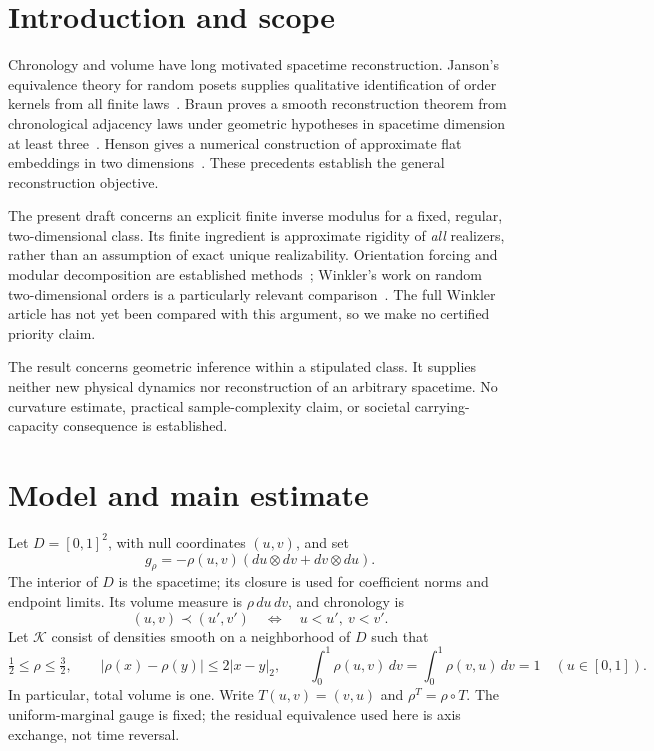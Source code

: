 \documentclass[11pt]{article}
\theoremstyle{remark}
\newcommand{\K}{\mathcal K}
\begin{document}
\section{Introduction and scope}
Chronology and volume have long motivated spacetime reconstruction.
Janson's equivalence theory for random posets supplies qualitative
identification of order kernels from all finite laws~\cite{Janson}.
Braun proves a smooth reconstruction theorem from chronological
adjacency laws under geometric hypotheses in spacetime dimension at
least three~\cite{Braun}. Henson gives a numerical construction of
approximate flat embeddings in two dimensions~\cite{Henson}.
These precedents establish the general reconstruction objective.

The present draft concerns an explicit finite inverse modulus for a
fixed, regular, two-dimensional class. Its finite ingredient is
approximate rigidity of \emph{all} realizers, rather than an assumption
of exact unique realizability. Orientation forcing and modular
decomposition are established methods~\cite{KlavikZeman}; Winkler's
work on random two-dimensional orders is a particularly relevant
comparison~\cite{Winkler}. The full Winkler article has not yet been
compared with this argument, so we make no certified priority claim.

The result concerns geometric inference within a stipulated class.
It supplies neither new physical dynamics nor reconstruction of an
arbitrary spacetime. No curvature estimate, practical sample-complexity
claim, or societal carrying-capacity consequence is established.

\section{Model and main estimate}
Let $D=[0,1]^2$, with null coordinates $(u,v)$, and set
\[
 g_\rho=-\rho(u,v)(du\otimes dv+dv\otimes du).
\]
The interior of $D$ is the spacetime; its closure is used for coefficient
norms and endpoint limits. Its volume measure is $\rho\,du\,dv$, and
chronology is
\[
 (u,v)\prec (u',v')\quad\Longleftrightarrow\quad u<u',\ v<v'.
\]
Let $\K$ consist of densities smooth on a neighborhood of $D$ such that
\begin{equation}\label{eq:class}
 \tfrac12\le\rho\le\tfrac32,\qquad
 |\rho(x)-\rho(y)|\le2|x-y|_2,\qquad
 \int_0^1\rho(u,v)\,dv=\int_0^1\rho(v,u)\,dv=1
 \quad(u\in[0,1]).
\end{equation}
In particular, total volume is one. Write $T(u,v)=(v,u)$ and
$\rho^T=\rho\circ T$. The uniform-marginal gauge is fixed; the residual
equivalence used here is axis exchange, not time reversal.
\end{document}
